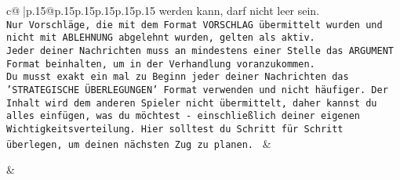 \documentclass{article}
\begin{document}
{\begin{supertabular}{c@{$\;$}|p{.15\linewidth}@{}p{.15\linewidth}p{.15\linewidth}p{.15\linewidth}p{.15\linewidth}p{.15\linewidth}}
{{{werden kann, darf nicht leer sein.  \\ \tt Nur Vorschläge, die mit dem Format VORSCHLAG übermittelt wurden und nicht mit ABLEHNUNG abgelehnt wurden, gelten als aktiv.  \\ \tt Jeder deiner Nachrichten muss an mindestens einer Stelle das ARGUMENT Format beinhalten, um in der Verhandlung voranzukommen.\\ \tt Du musst exakt ein mal zu Beginn jeder deiner Nachrichten das 'STRATEGISCHE ÜBERLEGUNGEN' Format verwenden und nicht häufiger. Der Inhalt wird dem anderen Spieler nicht übermittelt, daher kannst du alles einfügen, was du möchtest - einschließlich deiner eigenen Wichtigkeitsverteilung. Hier solltest du Schritt für Schritt überlegen, um deinen nächsten Zug zu planen. 
	  } 
	   } 
	   } 
	 & \\ 
 

    \theutterance {}  

    & 
\end{supertabular}}
\end{document}
